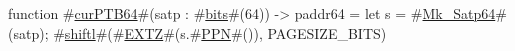 function #\hyperref[sailRISCVzcurPTB64]{curPTB64}#(satp : #\hyperref[sailRISCVzbits]{bits}#(64)) -> paddr64 = {
  let s = #\hyperref[sailRISCVzMkzySatp64]{Mk\_Satp64}#(satp);
  #\hyperref[sailRISCVzshiftl]{shiftl}#(#\hyperref[sailRISCVzEXTZ]{EXTZ}#(s.#\hyperref[sailRISCVzPPN]{PPN}#()), PAGESIZE_BITS)
}
